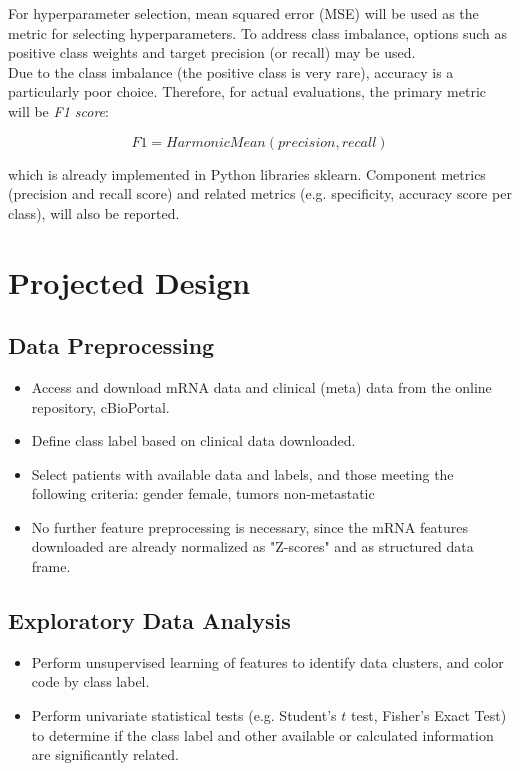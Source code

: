 \documentclass[11pt]{diazessay}
\begin{document}
For hyperparameter selection, mean squared error (MSE) will be used as the metric for selecting hyperparameters. To address class imbalance, options such as positive class weights and target precision (or recall) may be used. \\

Due to the class imbalance (the positive class is very rare), accuracy is a particularly poor choice. Therefore, for actual evaluations, the primary metric will be \textit{F1 score}:

$$F1 = HarmonicMean(precision, recall)$$

which is already implemented in Python libraries sklearn. Component metrics (precision and recall score) and related metrics (e.g. specificity, accuracy score per class), will also be reported.


\section{Projected Design}

\subsection{Data Preprocessing}

\begin{itemize}
	\item Access and download mRNA data and clinical (meta) data from the online repository, cBioPortal.
	\item Define class label based on clinical data downloaded.
	\item Select patients with available data and labels, and those meeting the following criteria: gender female, tumors non-metastatic
	\item No further feature preprocessing is necessary, since the mRNA features downloaded are already normalized as "Z-scores" and as structured data frame.
\end{itemize}

\subsection{Exploratory Data Analysis}

\begin{itemize}
	\item Perform unsupervised learning of features to identify data clusters, and color code by class label.
	\item Perform univariate statistical tests (e.g. Student's $t$ test, Fisher's Exact Test) to determine if the class label and other available or calculated information are significantly related.
\end{itemize}
\end{document}
